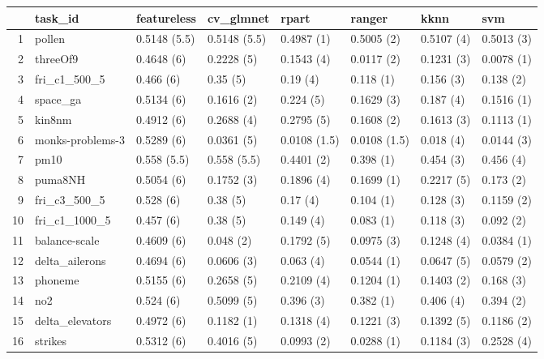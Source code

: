 \begin{table}[ht]
\centering
\begin{tabular}{rlllllll}
  \hline
 & task\_id & featureless & cv\_glmnet & rpart & ranger & kknn & svm \\ 
  \hline
1 & pollen & 0.5148 (5.5) & 0.5148 (5.5) & 0.4987 (1) & 0.5005 (2) & 0.5107 (4) & 0.5013 (3) \\ 
  2 & threeOf9 & 0.4648 (6) & 0.2228 (5) & 0.1543 (4) & 0.0117 (2) & 0.1231 (3) & 0.0078 (1) \\ 
  3 & fri\_c1\_500\_5 & 0.466 (6) & 0.35 (5) & 0.19 (4) & 0.118 (1) & 0.156 (3) & 0.138 (2) \\ 
  4 & space\_ga & 0.5134 (6) & 0.1616 (2) & 0.224 (5) & 0.1629 (3) & 0.187 (4) & 0.1516 (1) \\ 
  5 & kin8nm & 0.4912 (6) & 0.2688 (4) & 0.2795 (5) & 0.1608 (2) & 0.1613 (3) & 0.1113 (1) \\ 
  6 & monks-problems-3 & 0.5289 (6) & 0.0361 (5) & 0.0108 (1.5) & 0.0108 (1.5) & 0.018 (4) & 0.0144 (3) \\ 
  7 & pm10 & 0.558 (5.5) & 0.558 (5.5) & 0.4401 (2) & 0.398 (1) & 0.454 (3) & 0.456 (4) \\ 
  8 & puma8NH & 0.5054 (6) & 0.1752 (3) & 0.1896 (4) & 0.1699 (1) & 0.2217 (5) & 0.173 (2) \\ 
  9 & fri\_c3\_500\_5 & 0.528 (6) & 0.38 (5) & 0.17 (4) & 0.104 (1) & 0.128 (3) & 0.1159 (2) \\ 
  10 & fri\_c1\_1000\_5 & 0.457 (6) & 0.38 (5) & 0.149 (4) & 0.083 (1) & 0.118 (3) & 0.092 (2) \\ 
  11 & balance-scale & 0.4609 (6) & 0.048 (2) & 0.1792 (5) & 0.0975 (3) & 0.1248 (4) & 0.0384 (1) \\ 
  12 & delta\_ailerons & 0.4694 (6) & 0.0606 (3) & 0.063 (4) & 0.0544 (1) & 0.0647 (5) & 0.0579 (2) \\ 
  13 & phoneme & 0.5155 (6) & 0.2658 (5) & 0.2109 (4) & 0.1204 (1) & 0.1403 (2) & 0.168 (3) \\ 
  14 & no2 & 0.524 (6) & 0.5099 (5) & 0.396 (3) & 0.382 (1) & 0.406 (4) & 0.394 (2) \\ 
  15 & delta\_elevators & 0.4972 (6) & 0.1182 (1) & 0.1318 (4) & 0.1221 (3) & 0.1392 (5) & 0.1186 (2) \\ 
  16 & strikes & 0.5312 (6) & 0.4016 (5) & 0.0993 (2) & 0.0288 (1) & 0.1184 (3) & 0.2528 (4) \\ 
   \hline
\end{tabular}
\end{table}
